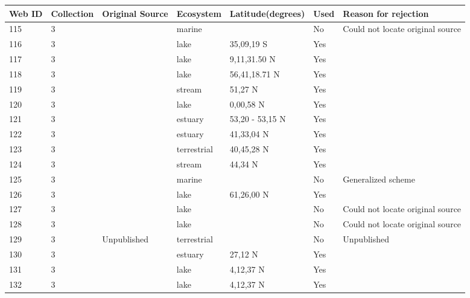 \documentclass[12pt]{article}
\begin{document}
\begin{landscape}
    \begin{table}[h!]
    \centering
    {\footnotesize
      \begin{tabular}{p{2.8cm}p{1.3cm}p{5.5cm}p{2.2cm}p{2.5cm}lp{3.5cm}}
        \hline
        Web ID & Collection & Original Source & Ecosystem & Latitude(degrees) & Used  & Reason for rejection  \\
        \hline
        115   & 3 & \citet{Koepcke1952}  & marine &       & No    & Could not locate original source \\
        116   & 3 & \citet{Hurlbert1972}  & lake  & 35,09,19 S & Yes   &       \\
        117   & 3 & \citet{Zaret1973}  & lake  & 9,11,31.50 N & Yes   &       \\
        118   & 3 & \citet{Bindloss1972}  & lake  & 56,41,18.71 N & Yes   &       \\
        119   & 3 & \citet{Mann1972}  & stream & 51,27 N & Yes   &       \\
        120   & 3 & \citet{Moriarty1973}  & lake  & 0,00,58 N & Yes   &       \\
        121   & 3 & \citet{VanEs1977}  & estuary & 53,20 - 53,15 N & Yes   &       \\
        122   & 3 & \citet{Nixon1973}  & estuary & 41,33,04 N & Yes   &       \\
        123   & 3 & \citet{Harris1972}  & terrestrial & 40,45,28 N & Yes   &       \\
        124   & 3 & \citet{Collins1976}  & stream & 44,34 N & Yes   &       \\
        125   & 3 & \citet{Landry1977}  & marine &       & No    & Generalized scheme \\
        126   & 3 & \citet{Larsson1978}  & lake  & 61,26,00 N & Yes   &       \\
        127   & 3 & \citet{Beaver1979}  & lake  &       & No    & Could not locate original source \\
        128   & 3 & \citet{Beaver1979}  & lake  &       & No    & Could not locate original source \\
        129   & 3 & Unpublished & terrestrial &       & No    & Unpublished \\
        130   & 3 & \citet{Odum1975}  & estuary & 27,12 N & Yes   &       \\
        131   & 3 & \citet{Beaver1985}  & lake  & 4,12,37 N & Yes   &       \\
        132   & 3 & \citet{Beaver1985}  & lake  & 4,12,37 N & Yes   &       \\

\end{tabular}}
\end{table}
\end{landscape}
\end{document}

